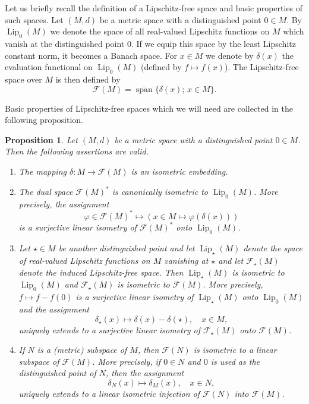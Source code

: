 \documentclass{amsart}
\numberwithin{equation}{section}
\newtheorem{prop}[thm]{Proposition}
\theoremstyle{definition}
\def\F{\mathcal F}
\def \Lip {\operatorname{Lip}}
\def\span{\operatorname{span}}
\newcommand{\setsep}{;\,}
\begin{document}
Let us briefly recall the definition of a Lipschitz-free space and basic properties of such spaces. Let $(M,d)$ be a metric space with a distinguished point $0\in M$. By $\Lip_0(M)$ we denote the space of all real-valued Lipschitz functions on $M$ which vanish at the distinguished point $0$. If we equip this space by the least Lipschitz constant norm, it becomes a Banach space.
For $x\in M$ we denote by $\delta(x)$ the evaluation functional on $\Lip_0(M)$ (defined by $f\mapsto f(x)$). The Lipschitz-free space over $M$ is then defined by
$$\F(M)=\overline{\span}\{\delta(x)\setsep x\in M\}.$$

Basic properties of Lipschitz-free spaces which we will need are collected in the following proposition.

\begin{prop}\label{P:LF-basic}
    Let $(M,d)$ be a metric space with a distinguished point $0\in M$. Then the following assertions are valid.
    \begin{enumerate}[$(a)$]
        \item The mapping $\delta:M\to\F(M)$ is an isometric embedding.
        \item The dual space $\F(M)^*$ is canonically isometric to $\Lip_0(M)$. More precisely, the assignment
        $$\varphi\in \F(M)^*\mapsto ( x\in M\mapsto \varphi(\delta(x)) )$$
        is a surjective linear isometry of $\F(M)^*$ onto $\Lip_0(M)$.
        \item Let $\star\in M$ be another distinguished point and let $\Lip_\star(M)$ denote the space of real-valued Lipschitz functions on $M$ vanishing at $\star$ and let $\F_\star(M)$ denote the induced Lipschitz-free space. Then $\Lip_\star(M)$ is isometric to $\Lip_0(M)$ and $\F_\star(M)$ is isometric to $\F(M)$. More precisely,
        $f\mapsto f-f(0)$ is a surjective linear isometry of $\Lip_\star(M)$ onto $\Lip_0(M)$ and the assignment
        $$\delta_\star(x)\mapsto \delta(x)-\delta(\star), \quad x\in M,$$
        uniquely extends to a surjective linear isometry of $\F_\star(M)$ onto $\F(M)$.
        \item If $N$ is a (metric) subspace of $M$, then $\F(N)$ is isometric to a linear subspace of $\F(M)$. More precisely, if $0\in N$ and $0$ is used as the distinguished point of $N$, then the assignment
        $$\delta_N(x)\mapsto \delta_M(x), \quad x\in N,$$
        uniquely extends to a linear isometric injection of $\F(N)$ into $\F(M)$.
    \end{enumerate}
\end{prop}
\end{document}
